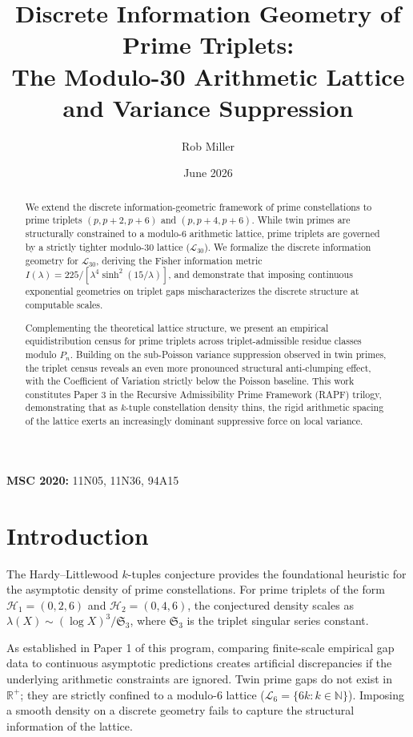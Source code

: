 \documentclass[11pt]{article}
\title{Discrete Information Geometry of Prime Triplets: \\ The Modulo-30 Arithmetic Lattice and Variance Suppression}
\author{Rob Miller}
\date{June 2026}
\begin{document}
\maketitle

\begin{abstract}
We extend the discrete information-geometric framework of prime constellations to prime triplets $(p, p+2, p+6)$ and $(p, p+4, p+6)$. While twin primes are structurally constrained to a modulo-6 arithmetic lattice, prime triplets are governed by a strictly tighter modulo-30 lattice ($\mathcal{L}_{30}$). We formalize the discrete information geometry for $\mathcal{L}_{30}$, deriving the Fisher information metric $I(\lambda) = 225/[\lambda^4 \sinh^2(15/\lambda)]$, and demonstrate that imposing continuous exponential geometries on triplet gaps mischaracterizes the discrete structure at computable scales. 

Complementing the theoretical lattice structure, we present an empirical equidistribution census for prime triplets across triplet-admissible residue classes modulo $P_n$. Building on the sub-Poisson variance suppression observed in twin primes, the triplet census reveals an even more pronounced structural anti-clumping effect, with the Coefficient of Variation strictly below the Poisson baseline. This work constitutes Paper 3 in the Recursive Admissibility Prime Framework (RAPF) trilogy, demonstrating that as $k$-tuple constellation density thins, the rigid arithmetic spacing of the lattice exerts an increasingly dominant suppressive force on local variance.
\end{abstract}

\noindent \textbf{MSC 2020:} 11N05, 11N36, 94A15

\section{Introduction}

The Hardy--Littlewood $k$-tuples conjecture provides the foundational heuristic for the asymptotic density of prime constellations. For prime triplets of the form $\mathcal{H}_1 = (0, 2, 6)$ and $\mathcal{H}_2 = (0, 4, 6)$, the conjectured density scales as $\lambda(X) \sim (\log X)^3 / \mathfrak{S}_3$, where $\mathfrak{S}_3$ is the triplet singular series constant. 

As established in Paper 1 of this program, comparing finite-scale empirical gap data to continuous asymptotic predictions creates artificial discrepancies if the underlying arithmetic constraints are ignored. Twin prime gaps do not exist in $\mathbb{R}^+$; they are strictly confined to a modulo-6 lattice ($\mathcal{L}_6 = \{6k : k \in \mathbb{N}\}$). Imposing a smooth density on a discrete geometry fails to capture the structural information of the lattice.
\end{document}
